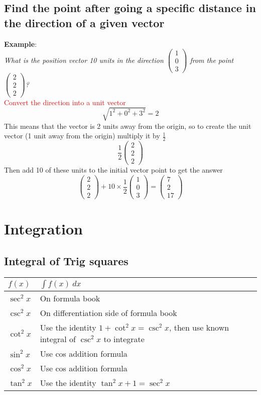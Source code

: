\documentclass{article}[18pt]
\begin{document}
\subsection{Find the point after going a specific distance in the direction of a given vector}
\textbf{Example}:\\
\textit{What is the position vector 10 units in the direction
$\begin{pmatrix}1\\0\\3\end{pmatrix}$ from the point $\begin{pmatrix}2\\2\\2\end{pmatrix}$?}\\
\textcolor{red}{Convert the direction into a unit vector}
$$\sqrt{1^2+0^2+3^2}=2$$
This means that the vector is 2 units away from the origin, so to create the unit vector (1 unit away from the origin) multiply it by $\frac{1}{2}$
$$\frac{1}{2}\begin{pmatrix}2\\2\\2\end{pmatrix}$$
Then add 10 of these units to the initial vector point to get the answer
$$\begin{pmatrix}2\\2\\2\end{pmatrix}+10\times\frac{1}{2}\begin{pmatrix}1\\0\\3\end{pmatrix}=\begin{pmatrix}7\\2\\17\end{pmatrix}$$
\section{Integration}
\subsection{Integral of Trig squares}
{\renewcommand{\arraystretch}{2}
\begin{tabularx}{\textwidth}{|X|X|}
\hline
$f(x)$&$\int f(x) \ dx$\\
\hline
$\sec^2x$&On formula book\\
\hline
$\csc^2x$&On differentiation side of formula book\\
\hline
$\cot^2x$&Use the identity
$1+\cot^2x=\csc^2x$, then use known integral of $\csc^2x$ to integrate\\
\hline
$\sin^2x$&Use cos addition formula\\
\hline
$\cos^2x$&Use cos addition formula\\
\hline
$\tan^2x$&Use the identity $\tan^2x+1=\sec^2x$\\
\hline
\end{tabularx}}
\end{document}
